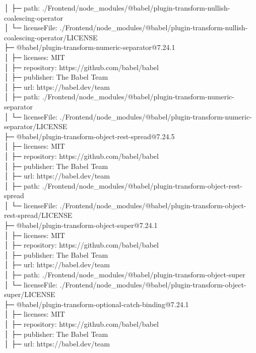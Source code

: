 │  ├─ path: ./Frontend/node\_modules/@babel/plugin-transform-nullish-coalescing-operator\\
│  └─ licenseFile: ./Frontend/node\_modules/@babel/plugin-transform-nullish-coalescing-operator/LICENSE\\
├─ @babel/plugin-transform-numeric-separator@7.24.1\\
│  ├─ licenses: MIT\\
│  ├─ repository: https://github.com/babel/babel\\
│  ├─ publisher: The Babel Team\\
│  ├─ url: https://babel.dev/team\\
│  ├─ path: ./Frontend/node\_modules/@babel/plugin-transform-numeric-separator\\
│  └─ licenseFile: ./Frontend/node\_modules/@babel/plugin-transform-numeric-separator/LICENSE\\
├─ @babel/plugin-transform-object-rest-spread@7.24.5\\
│  ├─ licenses: MIT\\
│  ├─ repository: https://github.com/babel/babel\\
│  ├─ publisher: The Babel Team\\
│  ├─ url: https://babel.dev/team\\
│  ├─ path: ./Frontend/node\_modules/@babel/plugin-transform-object-rest-spread\\
│  └─ licenseFile: ./Frontend/node\_modules/@babel/plugin-transform-object-rest-spread/LICENSE\\
├─ @babel/plugin-transform-object-super@7.24.1\\
│  ├─ licenses: MIT\\
│  ├─ repository: https://github.com/babel/babel\\
│  ├─ publisher: The Babel Team\\
│  ├─ url: https://babel.dev/team\\
│  ├─ path: ./Frontend/node\_modules/@babel/plugin-transform-object-super\\
│  └─ licenseFile: ./Frontend/node\_modules/@babel/plugin-transform-object-super/LICENSE\\
├─ @babel/plugin-transform-optional-catch-binding@7.24.1\\
│  ├─ licenses: MIT\\
│  ├─ repository: https://github.com/babel/babel\\
│  ├─ publisher: The Babel Team\\
│  ├─ url: https://babel.dev/team\\

